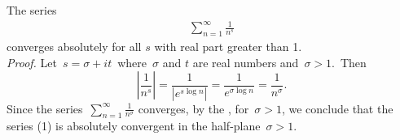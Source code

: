 \documentclass[12pt]{article}
\theoremstyle{definition}
\begin{document}
The series
\begin{align}
\sum_{n=1}^\infty\frac{1}{n^s}
\end{align}
converges absolutely for all $s$ with real part greater than 1.\\

{\em Proof.}  Let\, $s = \sigma+it$\, where\, $\sigma$ and $t$ are 
real numbers and\, $\sigma > 1$.\, Then
$$\left|\frac{1}{n^s}\right| = \frac{1}{|e^{s\log{n}}|} = 
\frac{1}{e^{\sigma\log{n}}} = \frac{1}{n^\sigma}.$$
Since the series \,$\sum_{n=1}^\infty\frac{1}{n^\sigma}$ converges, by the , for\, $\sigma > 1$, we conclude that the series (1) is absolutely convergent in the half-plane \,$\sigma > 1$.  
\end{document}
